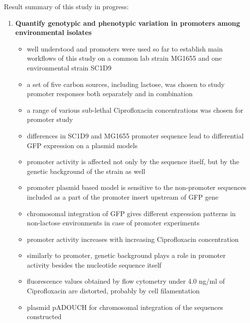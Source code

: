 \bigbreak
Result summary of this study in progress:
\begin{enumerate}[font=\bfseries]

	\item \textbf{Quantify genotypic and phenotypic variation in promoters among environmental  isolates}
	
	\begin{itemize}
	
		\item well understood  and  promoters were used so far to establish main workflows of this study on a common lab strain MG1655 and one environmental strain SC1\textunderscore D9
		\item a set of five carbon sources, including lactose, was chosen to study  promoter responses both separately and in combination
		\item a range of various sub-lethal Ciprofloxacin concentrations was chosen for  promoter study
		\item differences in SC1\textunderscore D9 and MG1655  promoter sequence lead to differential GFP expression on a plasmid models
		\item {} promoter activity is affected not only by the sequence itself, but by the genetic background of the strain as well
		\item {} promoter plasmid based model is sensitive to the non-promoter sequences included as a part of the promoter insert upstream of GFP gene
		\item chromosomal integration of GFP gives different expression patterns in non-lactose environments in case of  promoter experiments
		\item {} promoter activity increases with increasing Ciprofloxacin concentration
		\item similarly to  promoter, genetic background plays a role in  promoter activity besides the nucleotide sequence itself
		\item fluorescence values obtained by flow cytometry under 4.0 ng/ml of Ciprofloxacin are distorted, probably by cell filamentation
		\item plasmid pADOUCH for chromosomal integration of the  sequences constructed
	
	\end{itemize}

\end{enumerate} 

